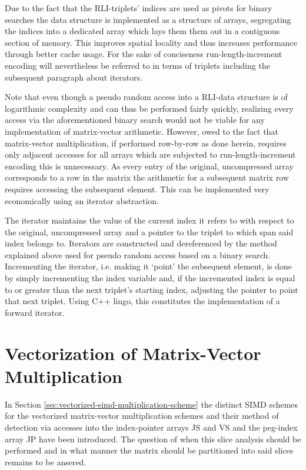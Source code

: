     Due to the fact that the RLI-triplets' indices are used as pivots for binary searches the data structure is
    implemented as a structure of arrays, segregating the indices into a dedicated array which lays them them out in a
    contiguous section of memory. This improves spatial locality and thus increases performance through better cache
    usage. For the sake of conciseness run-length-increment encoding will nevertheless be referred to in terms of
    triplets including the subsequent paragraph about iterators.

    Note that even though a pseudo random access into a RLI-data structure is of logarithmic complexity and can thus be
    performed fairly quickly, realizing every access via the aforementioned binary search would not be viable for any
    implementation of matrix-vector arithmetic. However, owed to the fact that matrix-vector multiplication, if
    performed row-by-row as done herein, requires only adjacent accesses for all arrays which are subjected to
    run-length-increment encoding this is unnecessary. As every entry of the original, uncompressed array corresponds
    to a row in the matrix the arithmetic for a subsequent matrix row requires accessing the subsequent element. This
    can be implemented very economically using an iterator abstraction.

    The iterator maintains the value of the current index it refers to with respect to the original, uncompressed array
    and a pointer to the triplet to which span said index belongs to. Iterators are constructed and dereferenced by the
    method explained above used for pseudo random access based on a binary search. Incrementing the iterator, i.e.
    making it `point' the subsequent element, is done by simply incrementing the index variable and, if the incremented
    index is equal to or greater than the next triplet's starting index, adjusting the pointer to point that next
    triplet. Using C++ lingo, this constitutes the implementation of a forward iterator.

    \section{Vectorization of Matrix-Vector Multiplication} \label{sec:vectorization-of-mvm}

      In Section \ref{sec:vectorized-simd-multiplication-scheme} the distinct SIMD schemes for the vectorized
      matrix-vector multiplication schemes and their method of detection via accesses into the index-pointer arrays JS
      and VS and the peg-index array JP have been introduced. The question of when this slice analysis should be
      performed and in what manner the matrix should be partitioned into said slices remains to be ansered.


